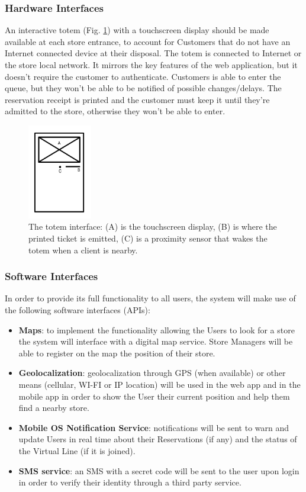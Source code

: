 \subsubsection{Hardware Interfaces}

An interactive totem (Fig. \ref{fig:totem}) with a touchscreen display should be made available at each store entrance, to account for Customers that do not have an Internet connected device at their disposal.
The totem is connected to Internet or the store local network.
It mirrors the key features of the web application, but it doesn't require the customer to
authenticate. Customers is able to enter the queue, but they won't be able to
be notified of possible changes/delays. The reservation receipt is printed and the customer must keep it until they're
admitted to the store, otherwise they won't be able to enter.
\begin{figure}[H]
    \centering
    \includegraphics[width=0.25\textwidth]{images/totem.pdf}
    \caption{The totem interface: (A) is the touchscreen display,
    (B) is where the printed ticket is emitted, (C) is a proximity sensor that wakes the
    totem when a client is nearby.}
    \label{fig:totem}
\end{figure}

\subsubsection{Software Interfaces}
In order to provide its full functionality to all users, the system will make use of the following software interfaces (APIs):
\begin{itemize}
    \item \textbf{Maps}: to implement the functionality allowing the Users to look for a store the system will interface with a digital map service. Store Managers will be able to register on the map the position of their store.
    \item \textbf{Geolocalization}: geolocalization through GPS (when available) or other means (cellular, WI-FI or IP location) will be used in the web app and in the mobile app in order to show the User their current position and help them find a nearby store.
    \item \textbf{Mobile OS Notification Service}: notifications will be sent to warn and update Users in real time about their Reservations (if any) and the status of the Virtual Line (if it is joined).
    \item \textbf{SMS service}: an SMS with a secret code will be sent to the user upon login in order to verify their identity through a third party service.
\end{itemize}


